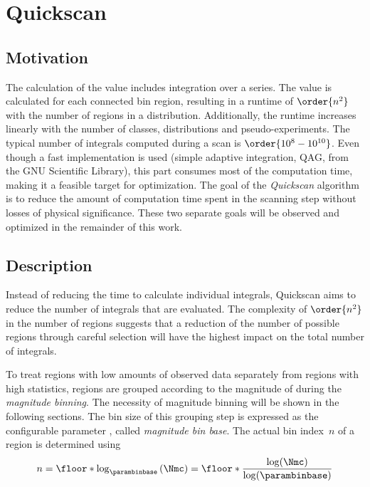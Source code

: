 
\chapter{Quickscan}

\section{Motivation}
The calculation of the \p value includes integration over a series. The \p value is calculated for each connected bin region, resulting in a runtime of $\order{n^2}$ with the number of regions in a distribution. Additionally, the runtime increases linearly with the number of classes, distributions and pseudo-experiments.
The typical number of integrals computed during a scan is $\order{10^{8} - 10^{10}}$. Even though a fast implementation is used (simple adaptive integration, QAG, from the GNU Scientific Library), this part consumes most of the computation time, making it a feasible target for optimization. 
The goal of the \emph{Quickscan} algorithm is to reduce the amount of computation time spent in the scanning step without losses of physical significance. These two separate goals will be observed and optimized in the remainder of this work.


\section{Description}
Instead of reducing the time to calculate individual integrals, Quickscan aims to reduce the number of integrals that are evaluated. The complexity of $\order{n^2}$ in the number of regions suggests that a reduction of the number of possible regions through careful selection will have the highest impact on the total number of integrals.

To treat regions with low amounts of observed data separately from regions with high statistics, regions are grouped according to the magnitude of \Nmc during the \emph{magnitude binning}. The necessity of magnitude binning will be shown in the following sections.
The bin size of this grouping step is expressed as the configurable parameter \parambinbase, called \emph{magnitude bin base}. The actual bin index~$n$ of a region is determined using
\begin{equation}
n = \floor*{\log_\parambinbase\left(\Nmc\right)} =  \floor*{\frac{\log(\Nmc)}{\log(\parambinbase)}}
\end{equation}

